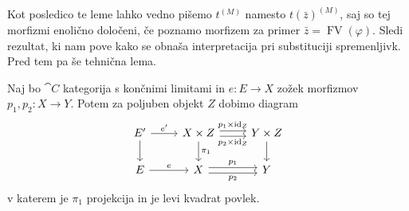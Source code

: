 \documentclass[../kategoricna_logika.tex]{subfiles}
\begin{document}
  Kot posledico te leme lahko vedno pišemo $t^{(M)}$ namesto
  $t(\bar{z})^{(M)}$, saj so tej morfizmi enolično določeni, če
  poznamo morfizem za primer $\bar{z} = \operatorname{FV}(\varphi)$.
  Sledi rezultat, ki nam pove kako se obnaša interpretacija pri
  substituciji spremenljivk. Pred tem pa še tehnična lema.
  \begin{lema}\label{lema:zožek-dodatnega-faktorja}
    Naj bo $\cat{C}$ kategorija s končnimi limitami in $e : E \to X$
    zožek morfizmov $p_1, p_2 : X \to Y$. Potem za poljuben objekt $Z$
    dobimo diagram
    \begin{equation*}
      \begin{tikzcd}
        E' \ar[d] \ar[r, "e'"] & X \times Z \ar[d, "\pi_1"] \ar[r, shift left, "p_1 \times \mathrm{id}_Z"] \ar[r, shift right, "p_2 \times \mathrm{id}_Z"'] & Y \times Z \ar[d] \\
        E \ar[r, "e"] & X \ar[r, shift left, "p_1"] \ar[r, shift right, "p_2"'] & Y
      \end{tikzcd}
    \end{equation*}
    v katerem je $\pi_1$ projekcija in je levi kvadrat povlek.
  \end{lema}
\end{document}
